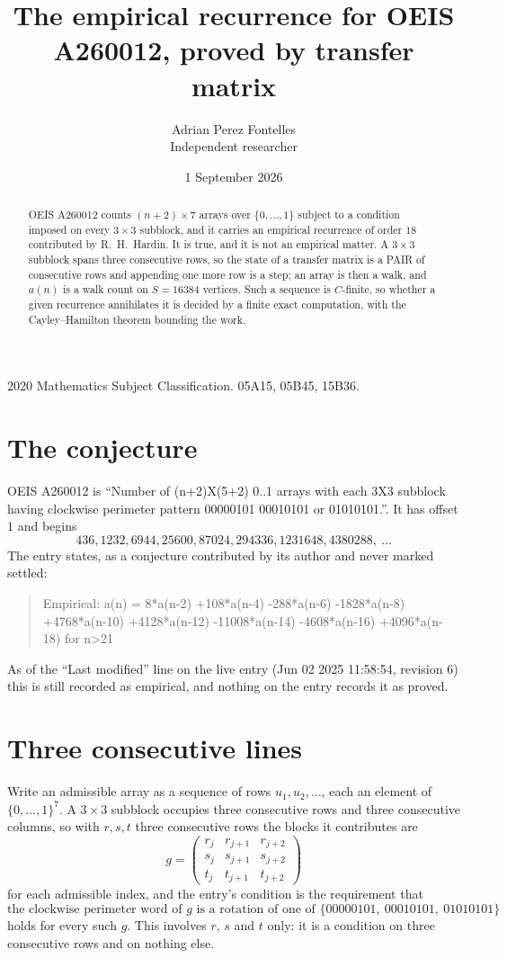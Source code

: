 \documentclass[11pt,a4paper]{article}
\title{The empirical recurrence for OEIS A260012, proved by transfer matrix}
\author{Adrian Perez Fontelles\\ \small Independent researcher}
\date{1 September 2026}
\theoremstyle{plain}
\theoremstyle{definition}
\begin{document}
\maketitle

\begin{abstract}
OEIS A260012 counts $(n+2)\times7$ arrays over $\{0,\dots,1\}$ subject to a condition imposed on
every $3\times3$ subblock, and it carries an empirical recurrence of order $18$
contributed by R.~H.~Hardin. It is true, and it is not an empirical matter. A $3\times3$
subblock spans three consecutive rows, so the state of a transfer matrix is a PAIR of
consecutive rows and appending one more row is a step; an array is then a walk, and
$a(n)$ is a walk count on $S=16384$ vertices. Such a sequence is $C$-finite, so whether a given
recurrence annihilates it is decided by a finite exact computation, with the Cayley--Hamilton
theorem bounding the work.
\end{abstract}

\noindent\small 2020 Mathematics Subject Classification. 05A15, 05B45, 15B36.\normalsize

\section{The conjecture}

OEIS A260012 is ``Number of (n+2)X(5+2) 0..1 arrays with each 3X3 subblock having clockwise perimeter pattern 00000101 00010101 or 01010101.''. It has offset $1$ and begins
\[
436, 1232, 6944, 25600, 87024, 294336, 1231648, 4380288,\ \dots
\]
The entry states, as a conjecture contributed by its author and never marked settled:
\begin{quote}
Empirical: a(n) = 8*a(n-2) +108*a(n-4) -288*a(n-6) -1828*a(n-8) +4768*a(n-10) +4128*a(n-12) -11008*a(n-14) -4608*a(n-16) +4096*a(n-18) for n>21
\end{quote}
As of the ``Last modified'' line on the live entry (Jun 02 2025 11:58:54, revision 6) this is still
recorded as empirical, and nothing on the entry records it as proved.

\section{Three consecutive lines}

Write an admissible array as a sequence of rows $u_1,u_2,\dots$, each an element of
$\{0,\dots,1\}^{7}$. A $3\times3$ subblock occupies three consecutive rows and
three consecutive columns, so with $r,s,t$ three consecutive rows the blocks it
contributes are
\[
g=\begin{pmatrix}r_j&r_{j+1}&r_{j+2}\\ s_j&s_{j+1}&s_{j+2}\\ t_j&t_{j+1}&t_{j+2}\end{pmatrix}
\]
for each admissible index, and the entry's condition is the requirement that
\[
\text{the clockwise perimeter word of }g\text{ is a rotation of one of }\{00000101,\ 00010101,\ 01010101\}
\]
holds for every such $g$. This involves $r$, $s$ and $t$ only: it is a condition on
three consecutive rows and on nothing else.
\end{document}
